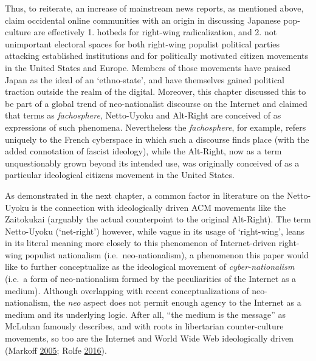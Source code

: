 \documentclass[10pt,british,A4paper,twoside]{memoir}
\begin{document}
Thus, to reiterate, an increase of mainstream news reports, as mentioned
above, claim occidental online communities with an origin in discussing
Japanese pop-culture are effectively 1. hotbeds for right-wing
radicalization, and 2. not unimportant electoral spaces for both
right-wing populist political parties attacking established institutions
and for politically motivated citizen movements in the United States and
Europe. Members of those movements have praised Japan as the ideal of an
`ethno-state', and have themselves gained political traction outside the
realm of the digital. Moreover, this chapter discussed this to be part
of a global trend of neo-nationalist discourse on the Internet and
claimed that terms as \emph{fachosphere}, Netto-Uyoku and Alt-Right are
conceived of as expressions of such phenomena. Nevertheless the
\emph{fachosphere}, for example, refers uniquely to the French
cyberspace in which such a discourse finds place (with the added
connotation of fascist ideology), while the Alt-Right, now as a term
unquestionably grown beyond its intended use, was originally conceived
of as a particular ideological citizens movement in the United States.

As demonstrated in the next chapter, a common factor in literature on
the Netto-Uyoku is the connection with ideologically driven ACM
movements like the Zaitokukai (arguably the actual counterpoint to the
original Alt-Right). The term Netto-Uyoku (`net-right') however, while
vague in its usage of `right-wing', leans in its literal meaning more
closely to this phenomenon of Internet-driven right-wing populist
nationalism (i.e.~neo-nationalism), a phenomenon this paper would like
to further conceptualize as the ideological movement of
\emph{cyber-nationalism} (i.e.~a form of neo-nationalism formed by the
peculiarities of the Internet as a medium). Although overlapping with
recent conceptualizations of neo-nationalism, the \emph{neo} aspect does
not permit enough agency to the Internet as a medium and its underlying
logic. After all, ``the medium is the message'' as McLuhan famously
describes, and with roots in libertarian counter-culture movements, so
too are the Internet and World Wide Web ideologically driven (Markoff
\protect\hyperlink{ref-markoff_what_2005}{2005}; Rolfe
\protect\hyperlink{ref-rolfe_reinvention_2016}{2016}).
\end{document}
